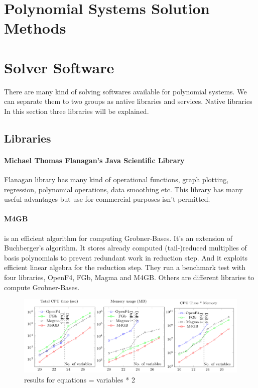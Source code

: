 \documentclass[11pt]{article}
\begin{document}
\section{Polynomial Systems Solution Methods}


\section{Solver Software}
There are many kind of solving softwares available for polynomial systems. We can separate them to two groups as native libraries and services.
Native libraries
In this section three libraries will be explained.
\subsection{Libraries}
\paragraph{Michael Thomas Flanagan's Java Scientific Library}

Flanagan library has many kind of operational functions, graph plotting, regression, polynomial operations, data smoothing etc.
This library has many useful advantages but use for commercial purposes isn't permitted.

\paragraph{M4GB}\cite{m4gbarticle}
is an  efficient algorithm for computing Grobner-Bases. It's an extension of Buchberger’s algorithm. It stores already computed (tail-)reduced multiplies of basis polynomials to prevent redundant work in reduction step. And it exploits efficient linear algebra for the reduction step.
They run a benchmark test with four libraries, OpenF4, FGb, Magma and M4GB. Others are different libraries to compute Grobner-Bases.
\begin{figure}[H]
  \begin{center}
    \includegraphics[width=\linewidth]{m4gb_m_2n.png}
    \caption{results for equations = variables * 2}
    \label{fig:m4gb_m_2n}
  \end{center}
\end{figure}
\end{document}
